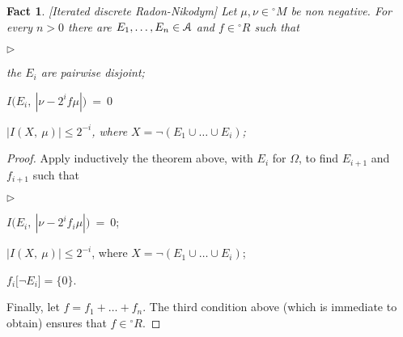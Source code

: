 \documentclass[12pt,letterpaper,oneside,reqno]{amsart}
\newcommand{\mylabel}[1]{{#1}\hfill}
\renewenvironment{itemize}
  {\begin{list}{$\triangleright$}{%
   \setlength{\parskip}{0mm}
   \setlength{\topsep}{.2\baselineskip}
   \setlength{\rightmargin}{0mm}
   \setlength{\listparindent}{0mm}
   \setlength{\itemindent}{0mm}
   \setlength{\labelwidth}{3ex}
   \setlength{\itemsep}{.2\baselineskip}
   \setlength{\parsep}{.2\baselineskip}
   \setlength{\partopsep}{0mm}
   \setlength{\labelsep}{1ex}
   \setlength{\leftmargin}{\labelwidth+\labelsep}
   \let\makelabel\mylabel}}{%
   \end{list}}
\theoremstyle{plain}
\newtheorem{fact}[theorem]{Fact}
\newtheorem{corollary}[theorem]{Corollary}
\theoremstyle{remark}
\begin{document}
\begin{fact}\label{thm_fRN2}
  [Iterated discrete Radon-Nikodym]
  Let $\mu,\nu\in{}^{\circ\!\!}M$ be non negative.
  For every $n>0$ there are $E_1,\dots,E_n\in{\EuScript A}$ and $f\in{}^{\circ\!\!}R$ such that
  \begin{itemize}
    \item[0.] the $E_i$ are pairwise disjoint;
    \item[1.] $I\big(E_i,\ |\nu-2^if\mu|\big)\ =\ 0$
    \item[2.] $|I(X,\ \mu)|\le2^{-i}$, where $X=\neg(E_1\cup\dots\cup E_i)$;
  \end{itemize}
\end{fact}


\begin{proof}
  Apply inductively the theorem above, with $E_i$ for $\Omega$, to find $E_{i+1}$ and $f_{i+1}$ such that
  \begin{itemize}
    \item[1$_i$.] $I\big(E_i,\ |\nu-2^if_i\mu|\big)\ =\ 0$;
    \item[2$_i$.] $|I(X,\ \mu)|\le2^{-i}$, where $X=\neg(E_1\cup\dots\cup E_i)$;
    \item[3$_i$.] $f_i\big[\neg E_i]=\{0\}$.
  \end{itemize}
  Finally, let $f=f_1+\dots+f_n$.
  The third condition above (which is immediate to obtain) ensures that $f\in{}^{\circ\!\!}R$.
\end{proof}




\end{document}
